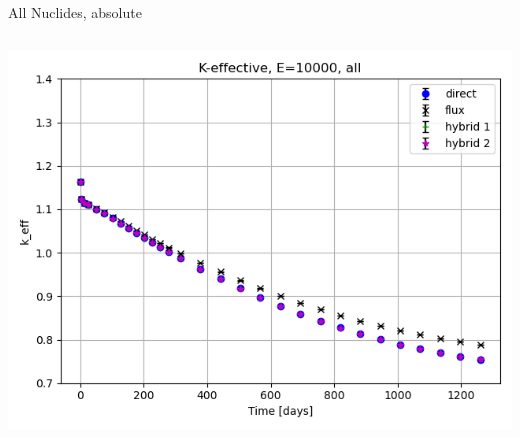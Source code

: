 \documentclass[
	11pt, %
	aspectratio=169, %
]{beamer}
\begin{document}
\begin{frame}{All Nuclides, absolute}
\begin{columns}[c]
\begin{column}{0.39\textwidth}
			\includegraphics[width=\textwidth]{../figures/keff/keff_all_10000.png}
		\end{column}
	\end{columns}
\end{frame}
\end{document}

